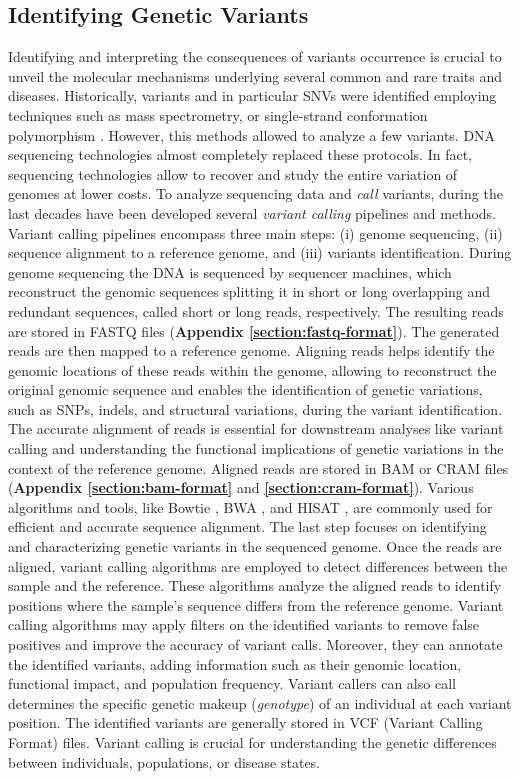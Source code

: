 \documentclass[a4paper, titlepage, openright]{book}
\begin{document}
\subsection{Identifying Genetic Variants}
Identifying and interpreting the consequences of variants occurrence is crucial to unveil the molecular mechanisms underlying several common and rare traits and diseases. Historically, variants and in particular SNVs were identified employing techniques such as mass spectrometry, or single-strand conformation polymorphism \citep{orita1989detection}. However, this methods allowed to analyze a few variants. DNA sequencing technologies almost completely replaced these protocols. In fact, sequencing technologies allow to recover and study the entire variation of genomes at lower costs. To analyze sequencing data and \emph{call} variants, during the last decades have been developed several \emph{variant calling} pipelines and methods. Variant calling pipelines encompass three main steps: (i) genome sequencing, (ii) sequence alignment to a reference genome, and (iii) variants identification. During genome sequencing the DNA is sequenced by sequencer machines, which reconstruct the genomic sequences splitting it in short or long overlapping and redundant sequences, called short or long reads, respectively. The resulting reads are stored in FASTQ files (\textbf{Appendix \ref{section:fastq-format}}). The generated reads are then mapped to a reference genome. Aligning reads helps identify the genomic locations of these reads within the genome, allowing to reconstruct the original genomic sequence and enables the identification of genetic variations, such as SNPs, indels, and structural variations, during the variant identification. The accurate alignment of reads is essential for downstream analyses like variant calling and understanding the functional implications of genetic variations in the context of the reference genome. Aligned reads are stored in BAM or CRAM files (\textbf{Appendix \ref{section:bam-format}} and \textbf{\ref{section:cram-format}}). Various algorithms and tools, like Bowtie \citep{langmead2012fast}, BWA \citep{li2009fast}, and HISAT \citep{kim2019graph}, are commonly used for efficient and accurate sequence alignment. The last step focuses on identifying and characterizing genetic variants in the sequenced genome. Once the reads are aligned, variant calling algorithms are employed to detect differences between the sample and the reference. These algorithms analyze the aligned reads to identify positions where the sample's sequence differs from the reference genome. Variant calling algorithms may apply filters on the identified variants to remove false positives and improve the accuracy of variant calls. Moreover, they can annotate the identified variants, adding information such as their genomic location, functional impact, and population frequency. Variant callers can also call determines the specific genetic makeup (\emph{genotype}) of an individual at each variant position. The identified variants are generally stored in VCF (Variant Calling Format) files. Variant calling is crucial for understanding the genetic differences between individuals, populations, or disease states. 
\end{document}
